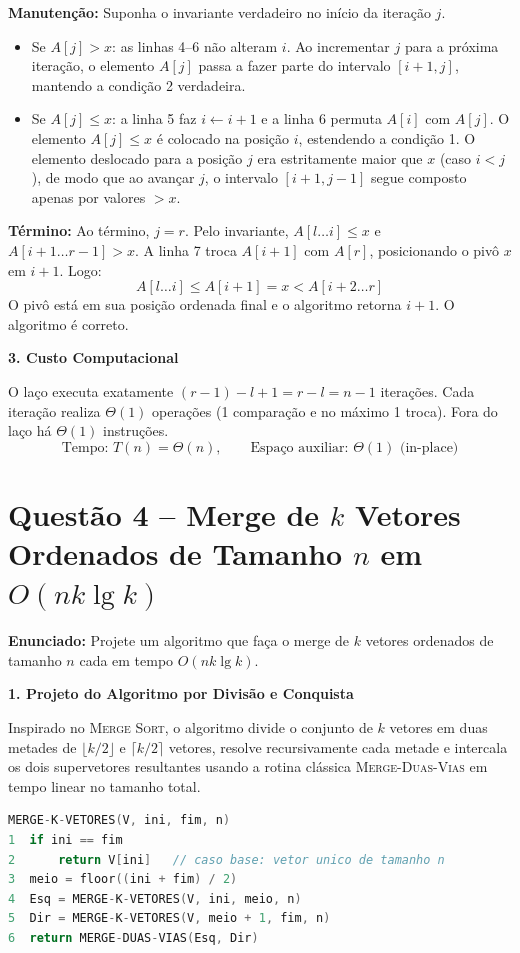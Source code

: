 \documentclass[11pt,a4paper]{article}
\newcommand{\res}[1]{\[\boxed{#1}\]}
\newcommand{\topico}[1]{\par\medskip\textbf{\color{azul}#1}\par}
\newcommand{\questao}[2]{\section*{Questão #1 -- #2}}
\begin{document}
\textbf{Manutenção:} Suponha o invariante verdadeiro no início da iteração $j$.
\begin{itemize}
  \item Se $A[j] > x$: as linhas 4--6 não alteram $i$. Ao incrementar $j$ para a próxima iteração, o elemento $A[j]$ passa a fazer parte do intervalo $[i+1, j]$, mantendo a condição 2 verdadeira.
  \item Se $A[j] \le x$: a linha 5 faz $i \leftarrow i + 1$ e a linha 6 permuta $A[i]$ com $A[j]$. O elemento $A[j] \le x$ é colocado na posição $i$, estendendo a condição 1. O elemento deslocado para a posição $j$ era estritamente maior que $x$ (caso $i < j$), de modo que ao avançar $j$, o intervalo $[i+1, j-1]$ segue composto apenas por valores $> x$.
\end{itemize}

\textbf{Término:} Ao término, $j = r$. Pelo invariante, $A[l \dots i] \le x$ e $A[i+1 \dots r-1] > x$. A linha 7 troca $A[i+1]$ com $A[r]$, posicionando o pivô $x$ em $i+1$. Logo:
\[
A[l \dots i] \le A[i+1] = x < A[i+2 \dots r]
\]
O pivô está em sua posição ordenada final e o algoritmo retorna $i+1$. O algoritmo é correto.

\topico{3. Custo Computacional}
O laço executa exatamente $(r-1) - l + 1 = r - l = n - 1$ iterações. Cada iteração realiza $\Theta(1)$ operações (1 comparação e no máximo 1 troca). Fora do laço há $\Theta(1)$ instruções.
\res{\text{Tempo: } T(n) = \Theta(n), \qquad \text{Espaço auxiliar: } \Theta(1) \text{ (in-place)}}

\newpage
\questao{4}{Merge de $k$ Vetores Ordenados de Tamanho $n$ em $O(nk \lg k)$}

\textbf{Enunciado:} Projete um algoritmo que faça o merge de $k$ vetores ordenados de tamanho $n$ cada em tempo $O(nk \lg k)$.

\topico{1. Projeto do Algoritmo por Divisão e Conquista}
Inspirado no \textsc{Merge Sort}, o algoritmo divide o conjunto de $k$ vetores em duas metades de $\lfloor k/2 \rfloor$ e $\lceil k/2 \rceil$ vetores, resolve recursivamente cada metade e intercala os dois supervetores resultantes usando a rotina clássica \textsc{Merge-Duas-Vias} em tempo linear no tamanho total.

\begin{lstlisting}[language=C]
MERGE-K-VETORES(V, ini, fim, n)
1  if ini == fim
2      return V[ini]   // caso base: vetor unico de tamanho n
3  meio = floor((ini + fim) / 2)
4  Esq = MERGE-K-VETORES(V, ini, meio, n)
5  Dir = MERGE-K-VETORES(V, meio + 1, fim, n)
6  return MERGE-DUAS-VIAS(Esq, Dir)
\end{lstlisting}
\end{document}
